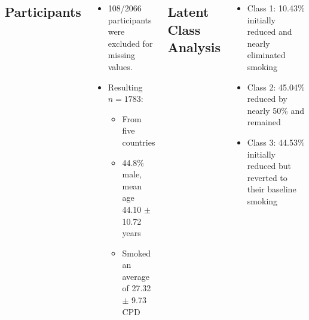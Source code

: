 \documentclass[
	25pt,
	a0paper, 
	portrait,
	blockverticalspace=-3em,
	margin=.5in,
	innermargin=0mm
]{tikzposter}
\begin{document}
	{
	\centering
	\begin{columns}
		\begin{minipage}[]{0.45\linewidth}
			\large
			\subsection*{Participants}
			\begin{itemize}
				\item 108/2066 participants were excluded for missing values. 
				\item  Resulting $n=1783$:
				\begin{itemize}
					\item From five countries
					\item 44.8\% male, mean age 44.10 $\pm$ 10.72 years
					\item Smoked an average of 27.32 $\pm$ 9.73 CPD
				\end{itemize}
			\end{itemize}
			\subsection*{Latent Class Analysis}

			\begin{itemize}
				\item Class 1: 10.43\% initially reduced and nearly eliminated smoking
				\item Class 2: 45.04\% reduced by nearly 50\% and remained
				\item Class 3: 44.53\% initially reduced but reverted to their baseline smoking
			\end{itemize}
		

\end{minipage}
\end{columns}}
\end{document}
